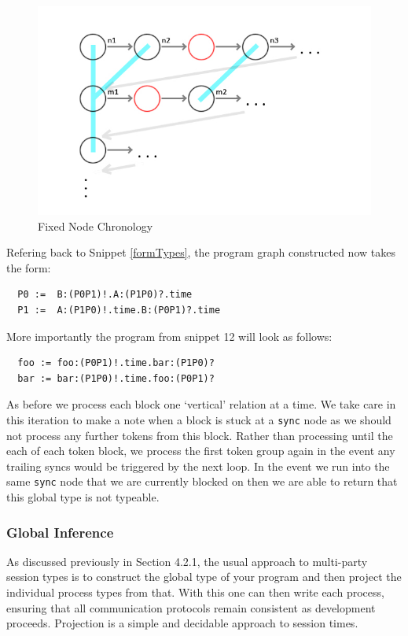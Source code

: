 \documentclass[11pt, abstracton, twoside, titlepage=true]{scrartcl}
\begin{document}
\begin{figure}[h!]
	\centering
	\includegraphics[width=\textwidth]{images/GraphTwo.jpg}
	\caption{Fixed Node Chronology}
\end{figure}

Refering back to Snippet \ref{formTypes}, the program graph constructed now takes
the form:
\\
\begin{lstlisting}
  P0 :=  B:(P0P1)!.A:(P1P0)?.time
  P1 :=  A:(P1P0)!.time.B:(P0P1)?.time
\end{lstlisting}

More importantly the program from snippet 12 will look as follows:
\\
\begin{lstlisting}
  foo := foo:(P0P1)!.time.bar:(P1P0)?
  bar := bar:(P1P0)!.time.foo:(P0P1)?
\end{lstlisting}

As before we process each block one `vertical' relation at a time. We take
care in this iteration to make a note when a block is stuck at a \texttt{sync}
node as we should not process any further tokens from this block. Rather than
processing until the each of each token block, we process the first token group
again in the event any trailing syncs would be triggered by the next loop. In
the event we run into the same \texttt{sync} node that we are currently blocked
on then we are able to return that this global type is not typeable.


\subsubsection{Global Inference}
As discussed previously in Section 4.2.1, the usual approach to multi-party session 
types is to construct the global type of your program and then project the 
individual process types from that. With this one can then write each process, 
ensuring that all communication protocols remain consistent as development 
proceeds. Projection is a simple and decidable approach to session times.
\end{document}
